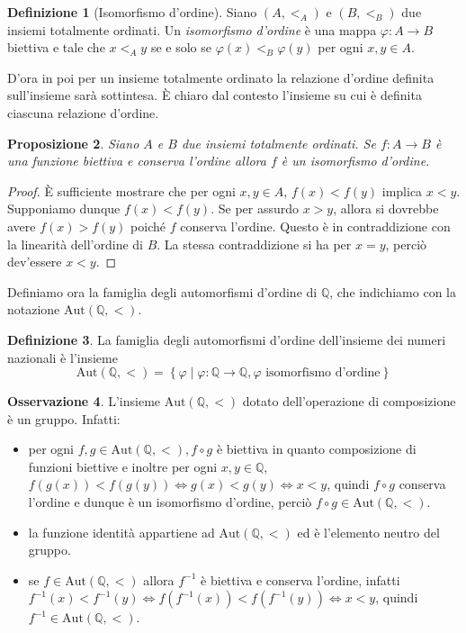 \documentclass[12pt,a4paper,openright]{report}
\newcommand{\aut}{ \mathrm{Aut} ( \mathbb{Q},< ) } %
\newcommand{\Q}{\mathbb{Q}} %
\newcommand{\0}{\setminus\{0\}} %
\theoremstyle{definition}
\newtheorem{defn}{Definizione}[chapter]
\newtheorem{oss}[defn]{Osservazione}
\theoremstyle{plain}
\newtheorem{prop}[defn]{Proposizione}
\begin{document}
\begin{defn}[Isomorfismo d'ordine]
Siano $(A,<_A) \mbox{ e } (B,<_B)$ due insiemi totalmente ordinati. Un \emph{isomorfismo d'ordine} è una mappa $\varphi: A \rightarrow B$ biettiva e tale che $x<_Ay$ se e solo se $\varphi(x)<_B\varphi(y)$ per ogni $x,y \in A$.
\end{defn}
D'ora in poi per un insieme totalmente ordinato la relazione d'ordine definita sull'insieme sarà sottintesa. È chiaro dal contesto l'insieme su cui è definita ciascuna relazione d'ordine.
\begin{prop}
    Siano $A$ e $B$ due insiemi totalmente ordinati. Se $f:A \rightarrow B$ è una funzione biettiva e conserva l'ordine allora $f$ è un isomorfismo d'ordine.
\end{prop}
\begin{proof}
    È sufficiente mostrare che per ogni $x,y \in A$, $f(x)<f(y)$ implica $x<y$. Supponiamo dunque $f(x)<f(y)$. Se per assurdo $x>y$, allora si dovrebbe avere $f(x)>f(y)$ poiché $f$ conserva l'ordine. Questo è in contraddizione con la linearità dell'ordine di $B$. La stessa contraddizione si ha per $x=y$, perciò dev'essere $x<y$.
\end{proof}

Definiamo ora la famiglia degli automorfismi d'ordine di $\Q$, che indichiamo con la notazione $\aut$.
\begin{defn}
La famiglia degli automorfismi d'ordine dell'insieme dei numeri nazionali è l'insieme
\[ \aut = \left\lbrace \varphi \mid \varphi: \Q \rightarrow \Q, \varphi \mbox{ isomorfismo d'ordine} \right\rbrace \]
\end{defn}
\begin{oss}\label{oss:aut_gruppo}
L'insieme $\aut$ dotato dell'operazione di composizione è un gruppo. Infatti:
\begin{itemize}
\item per ogni $f,g \in \aut , f \circ g$ è biettiva in quanto composizione di funzioni biettive e inoltre per ogni $x,y \in \Q$, $f(g(x))<f(g(y)) \Leftrightarrow g(x)<g(y) \Leftrightarrow x<y$, quindi $f \circ g$ conserva l'ordine e dunque è un isomorfismo d'ordine, perciò  $f \circ g \in \aut$. 
\item la funzione identità appartiene ad $\aut$ ed è l'elemento neutro del gruppo.
\item se $f \in \aut$ allora $f^{-1}$ è biettiva e conserva l'ordine, infatti $f^{-1}(x)<f^{-1}(y) \Leftrightarrow f(f^{-1}(x))<f(f^{-1}(y)) \Leftrightarrow x<y$, quindi $f^{-1} \in \aut$.
\end{itemize}
\end{oss}
\end{document}
